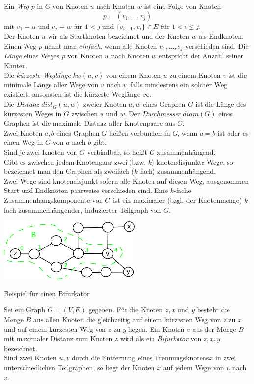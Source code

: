 Ein \emph{Weg} $p$ in $G$ von Knoten $u$ nach Knoten $w$ ist eine Folge von Knoten $$p=(v_1,\ldots,v_j)$$ mit $v_1=u$ und $v_j=w$ für $1<j$ und $\{v_{i-1},v_i\}\in E$ für $1 <i \leq j$.\\Der Knoten $u$ wir als Startknoten bezeichnet und der Knoten $w$ als Endknoten.\\Einen Weg $p$ nennt man \emph{einfach}, wenn alle Knoten $v_1,\ldots,v_j$ verschieden sind. Die \emph{Länge} eines Weges $p$ von Knoten $u$ nach Knoten $w$ entspricht der Anzahl seiner Kanten.\\Die \emph{kürzeste Weglänge} $kw(u, v)$ von einem Knoten $u$ zu einem Knoten $v$ ist die minimale Länge aller Wege von $u$ nach $v$, falls mindestens ein solcher Weg existiert, ansonsten ist die kürzeste Weglänge $\infty$.\\Die \emph{Distanz} $dist_G(u,w)$ zweier Knoten $u,w$ eines Graphen $G$ ist die Länge des kürzesten Weges in $G$ zwischen $u$ und $w$. Der \emph{Durchmesser} $diam(G)$ eines Graphen ist die maximale Distanz aller Knotenpaare aus $G$.\\
Zwei Knoten $a, b$ eines Graphen $G$ heißen verbunden in $G$, wenn $a = b$ ist oder es einen Weg in $G$ von $a$ nach $b$ gibt.\\Sind je zwei Knoten von $G$ verbindbar, so heißt $G$ zusammenhängend.\\Gibt es zwischen jedem Knotenpaar zwei (bzw. $k$) knotendisjunkte Wege, so bezeichnet man den Graphen als zweifach ($k$-fach) zusammenhängend.\\Zwei Wege sind knotendisjunkt sofern alle Knoten auf diesen Weg, ausgenommen Start und Endknoten paarweise verschieden sind. Eine $k$-fache Zusammenhangskomponente von $G$ ist ein maximaler (bzgl. der Knotenmenge) $k$-fach zusammenhängender, induzierter Teilgraph von $G$.\newline \newline
\begin{floatingfigure}[l]{200pt}
\centering
\includegraphics*[width = 200pt]{bilder/bifurkator.pdf}
\caption{Beispiel für einen Bifurkator}
\label{bild:bifurkator}
\end{floatingfigure}  	 
\vspace{-2mm}
Sei ein Graph $G=(V,E)$ gegeben. Für die Knoten $z,x$ und $y$ besteht die Menge $B$ aus allen Knoten die gleichzeitig auf einem kürzesten Weg von $z$ zu $x$ und auf einem kürzesten Weg von $z$ zu $y$ liegen. Ein Knoten $v$ aus der Menge $B$ mit maximaler Distanz zum Knoten $z$ wird als ein \emph{Bifurkator} von $z, x, y$ bezeichnet.\\
Sind zwei Knoten $u,v$ durch die Entfernung eines Trennungsknotens$x$ in zwei unterschiedlichen Teilgraphen, so liegt der Knoten $x$ auf jedem Wege von $u$ nach $v$.

